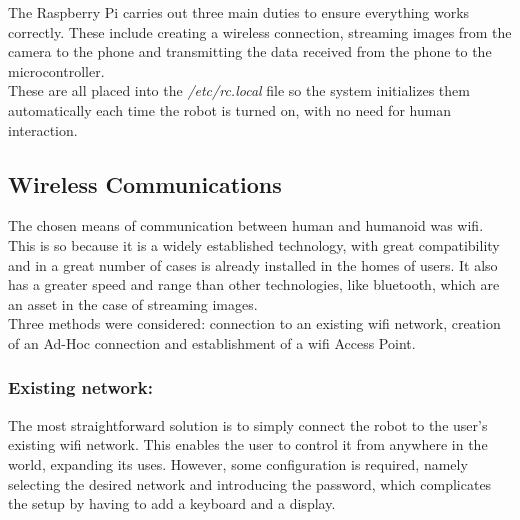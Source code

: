 The Raspberry Pi carries out three main duties to ensure everything works correctly. These include creating a wireless connection, streaming images from the camera to the phone and transmitting the data received from the phone to the microcontroller.\\

 These are all placed into the \textit{/etc/rc.local} file so the system initializes them automatically each time the robot is turned on, with no need for human interaction.








\subsection{Wireless Communications}%

The chosen means of communication between human and humanoid was wifi. This is so because it is a widely established technology, with great compatibility and in a great number of cases is already installed in the homes of users. It also has a greater speed and range than other technologies, like bluetooth, which are an asset in the case of streaming images.\\

Three methods were considered: connection to an existing wifi network, creation of an Ad-Hoc connection and establishment of a wifi Access Point.










\subsubsection{Existing network:}

The most straightforward solution is to simply connect the robot to the user's existing wifi network. This enables the user to control it from anywhere in the world, expanding its uses. However, some configuration is required, namely selecting the desired network and introducing the password, which complicates the setup by having to add a keyboard and a display.\\


